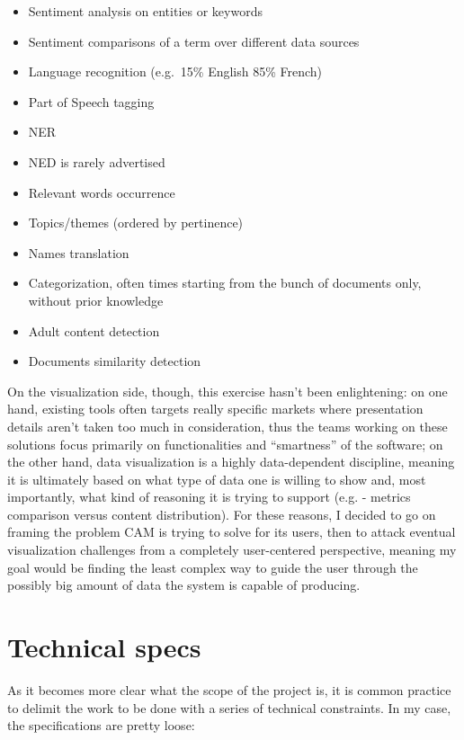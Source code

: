\documentclass[12pt,oneside,svgnames]{memoir}
\begin{document}
\begin{itemize}
\itemsep1pt\parskip0pt
\item
  Sentiment analysis on entities or keywords
\item
  Sentiment comparisons of a term over different data sources
\item
  Language recognition (e.g.~15\% English 85\% French)
\item
  Part of Speech tagging
\item
  NER
\item
  NED is rarely advertised
\item
  Relevant words occurrence
\item
  Topics/themes (ordered by pertinence)
\item
  Names translation
\item
  Categorization, often times starting from the bunch of documents only,
  without prior knowledge
\item
  Adult content detection
\item
  Documents similarity detection
\end{itemize}

On the visualization side, though, this exercise hasn't been
enlightening: on one hand, existing tools often targets really specific
markets where presentation details aren't taken too much in
consideration, thus the teams working on these solutions focus primarily
on functionalities and ``smartness'' of the software; on the other hand,
data visualization is a highly data-dependent discipline, meaning it is
ultimately based on what type of data one is willing to show and, most
importantly, what kind of reasoning it is trying to support (e.g. -
metrics comparison versus content distribution). For these reasons, I
decided to go on framing the problem CAM is trying to solve for its
users, then to attack eventual visualization challenges from a
completely user-centered perspective, meaning my goal would be finding
the least complex way to guide the user through the possibly big amount
of data the system is capable of producing.

\section{Technical specs}\label{technical-specs}

As it becomes more clear what the scope of the project is, it is common
practice to delimit the work to be done with a series of technical
constraints. In my case, the specifications are pretty loose:
\end{document}
